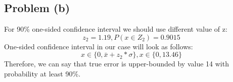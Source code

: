 \subsection*{Problem (b)}

For 90\% one-sided confidence interval we should use different value of z:
 \[
z_2=1.19, P(x\in Z_2)=0.9015
\]
One-sided confidence interval in our case will look as follows:
 \[
x\in \{0, \bar{x}+z_2*\sigma\},
x\in \{0, 13.46\}
\]
Therefore, we can say that true error is upper-bounded by value 14 with probability at least 90\%.
